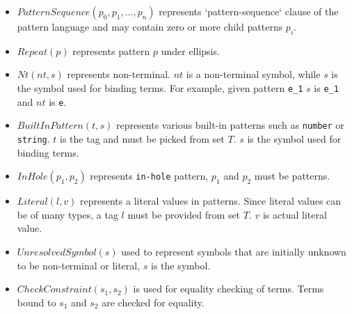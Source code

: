 \newcommand{\PatternSequence}{$PatternSequence(p_0, p_1, ..., p_n)$ }
\newcommand{\Repeat}{$Repeat(p)$ }
\newcommand{\Nt}{$Nt(nt, s)$ }
\newcommand{\BuiltInPattern}{$BuiltInPattern(t, s)$ }
\newcommand{\InHolePattern} {$InHole(p_1, p_2)$ }
\newcommand{\LiteralPattern}{$Literal(l, v)$ }
\newcommand{\UnresolvedSymbol}{$UnresolvedSymbol(s)$ }
\newcommand{\CheckConstraint}{$CheckConstraint(s_1, s_2)$ }


\begin{itemize}
\item
\PatternSequence represents `pattern-sequence` clause of the pattern language and may contain zero or more child patterns $p_i$.

\item 
\Repeat represents pattern $p$ under ellipsis.

\item 
\Nt represents non-terminal. $nt$ is a non-terminal symbol, while $s$ is the symbol used for binding terms. For example, given pattern \texttt{e\_1} $s$ is \texttt{e\_1} and $nt$ is \texttt{e}.

\item
\BuiltInPattern represents various built-in patterns such as \texttt{number} or \texttt{string}. $t$ is the tag and must be picked from set $T$. $s$ is the symbol used for binding terms.

\item
\InHolePattern represents \texttt{in-hole} pattern, $p_1$ and $p_2$ must be patterns.

\item 
\LiteralPattern represents a literal values in patterns. Since literal values can be of many types, a tag $l$ must be provided from set $T$. $v$ is actual literal value.

\item 
\UnresolvedSymbol used to represent symbols that are initially unknown to be non-terminal or literal, $s$ is the symbol.

\item
\CheckConstraint is used for equality checking of terms. Terms bound to $s_1$ and $s_2$ are checked for equality.

\end{itemize}





